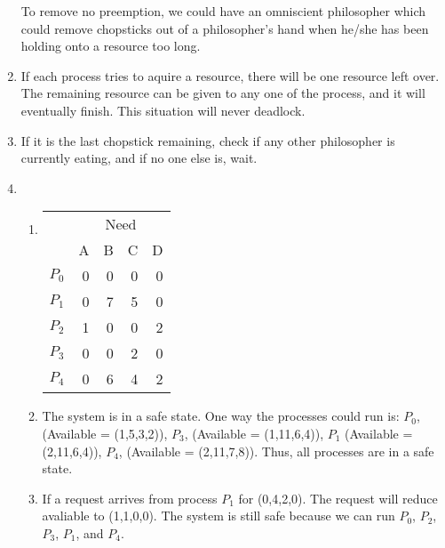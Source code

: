 \documentclass{article}
\begin{document}
\begin{enumerate}
To remove no preemption, we could have an omniscient philosopher which could remove chopsticks out of a philosopher's hand when he/she has been holding onto a resource too long.
\setcounter{enumi}{5}
\item If each process tries to aquire a resource, there will be one resource left over. The remaining resource can be given to any one of the process, and it will eventually finish. This situation will never deadlock.
\setcounter{enumi}{7}
\item If it is the last chopstick remaining, check if any other philosopher is currently eating, and if no one else is, wait.
\setcounter{enumi}{10}
\item
  \begin{enumerate}
  \item \begin{tabular}{l r r r r }
    & \multicolumn{4}{c}{Need}
    \\
    \cline{2-5}
          & A & B & C & D\\
    $P_0$ & 0 & 0 & 0 & 0\\
    $P_1$ & 0 & 7 & 5 & 0\\
    $P_2$ & 1 & 0 & 0 & 2\\
    $P_3$ & 0 & 0 & 2 & 0\\
    $P_4$ & 0 & 6 & 4 & 2
  \end{tabular}
  \item The system is in a safe state. One way the processes could run is: $P_0$, (Available = (1,5,3,2)), $P_3$, (Available = (1,11,6,4)), $P_1$ (Available = (2,11,6,4)), $P_4$, (Available = (2,11,7,8)). Thus, all processes are in a safe state.
  \item If a request arrives from process $P_1$ for (0,4,2,0). The request will reduce avaliable to (1,1,0,0). The system is still safe because we can run $P_0$, $P_2$, $P_3$, $P_1$, and $P_4$.
  \end{enumerate}

\end{enumerate}
\end{document}
